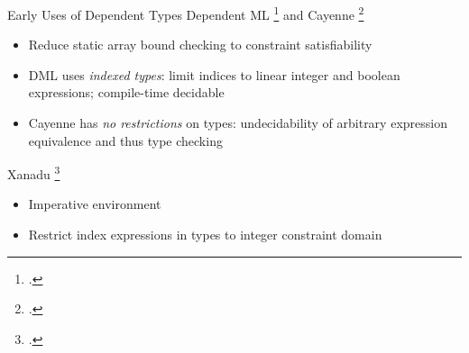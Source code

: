 \documentclass[aspectratio=169]{beamer}
\begin{document}
\begin{frame}{Early Uses of Dependent Types}
Dependent ML \footcite{xi_eliminating_1998} and Cayenne \footcite{augustsson_cayennelanguage_1998}
\begin{itemize}
    \item Reduce static array bound checking to constraint satisfiability
    \item DML uses \emph{indexed types}: limit indices to linear integer and boolean expressions; compile-time decidable 
    \item Cayenne has \emph{no restrictions} on types: undecidability of arbitrary expression equivalence and thus type checking 
\end{itemize}
Xanadu \footcite{xi_imperative_2000}
\begin{itemize}
    \item Imperative environment 
    \item Restrict index expressions in types to integer constraint domain 
\end{itemize}
    \vspace{0.2in}
\end{frame}

\end{document}
